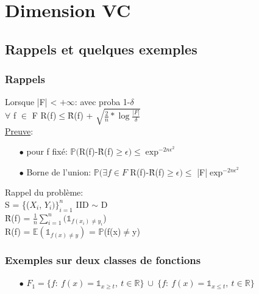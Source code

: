 \documentclass[a4paper]{report}
\begin{document}
\chapter*{Dimension VC}

\section{Rappels et quelques exemples}
\subsection*{Rappels}
Lorsque |F| < $ +\infty $: avec proba 1-$ \delta $\\
$ \forall $ f $ \in $ F R(f)$ \leq $\^R(f) + $\sqrt{\frac{2}{n}*\log\frac{|F|}{\delta}}$\\
\newline
\underline{Preuve}:\\
\begin{itemize}
\item[$\bullet$] pour f fixé: $\mathds{P}($R(f)-\^R(f)$\geq \epsilon)\leq \exp ^{-2n\epsilon ^2}$
\item[$\bullet$] Borne de l'union: $\mathds{P}(\exists f\in F$ R(f)-\^R(f)$\geq \epsilon)\leq $ |F|$\exp ^{-2n\epsilon ^2}$\\
\end{itemize}

\begin{tiny}
Rappel du problème:\\
S = \{($X_i$, $Y_i)\}_{i=1}^n$ IID $ \sim $ D\\
\^R(f) = $\frac{1}{n}\displaystyle { \sum_{i=1}^{n}}( \mathds{1}_{f(x_i)\neq y_i} $)\\
R(f) = $\mathds{E}(\mathds{1}_{ f(x)\neq y })$ = $\mathds{P}$(f(x)$\neq$y)\\
\end{tiny}


\subsection*{Exemples sur deux classes de fonctions}
\begin{itemize}
\item[$\bullet$] $F_1 = \{f:\ f(x)=\mathds{1}_{x\geq t},\ t\in \mathds{R}\}
\ \cup \ \{f:\ f(x)=\mathds{1}_{x\leq t},\ t\in \mathds{R}\}$\\
\end{itemize}
\end{document}
